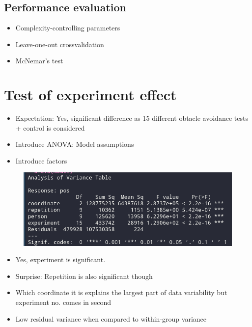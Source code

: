 \documentclass[12pt,fleqn]{article}
\begin{document}
\subsection{Performance evaluation}
\begin{itemize}
	\item Complexity-controlling parameters
	\item Leave-one-out crossvalidation
	\item McNemar's test
\end{itemize}
\section{Test of experiment effect}
\begin{itemize}
	\item Expectation: Yes, significant difference as 15 different obtacle avoidance tests + control is considered
\end{itemize}
\begin{itemize}
	\item Introduce ANOVA: Model assumptions
	\item Introduce factors
\end{itemize}
\begin{figure}[H]
	\centering
	\includegraphics[width=.7\linewidth]{p1_anova}
\end{figure}
\begin{itemize}
	\item Yes, experiment is significant. 
	\item Surprise: Repetition is also significant though
	\item Which coordinate it is explains the largest part of data variability but experiment no. comes in second
	\item Low residual variance when compared to within-group variance
\end{itemize}
\end{document}
